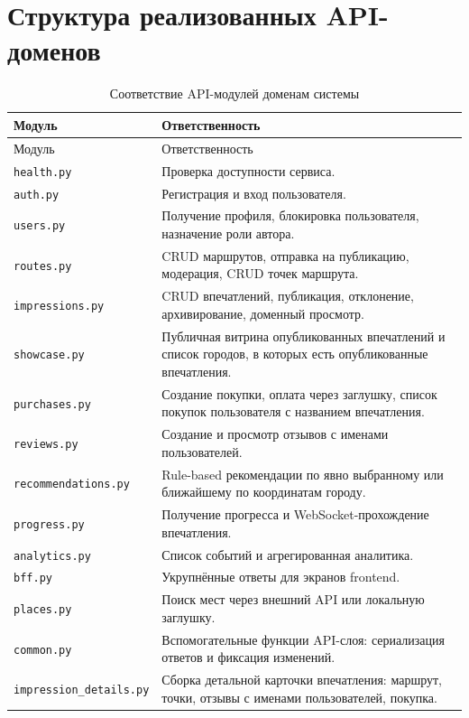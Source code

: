 \documentclass[a4paper,12pt]{extarticle}
\begin{document}
\newpage
\appendix

\section{Структура реализованных API-доменов}

\begin{longtable}{L{0.24\textwidth}L{0.66\textwidth}}
	\caption{Соответствие API-модулей доменам системы}
	\label{table:api-modules}\\
	\toprule
	Модуль & Ответственность \\
	\midrule
	\endfirsthead
	\toprule
	Модуль & Ответственность \\
	\midrule
	\endhead
	\texttt{health.py} & Проверка доступности сервиса. \\
	\texttt{auth.py} & Регистрация и вход пользователя. \\
	\texttt{users.py} & Получение профиля, блокировка пользователя, назначение роли автора. \\
	\texttt{routes.py} & CRUD маршрутов, отправка на публикацию, модерация, CRUD точек маршрута. \\
	\texttt{impressions.py} & CRUD впечатлений, публикация, отклонение, архивирование, доменный просмотр. \\
	\texttt{showcase.py} & Публичная витрина опубликованных впечатлений и список городов, в которых есть опубликованные впечатления. \\
	\texttt{purchases.py} & Создание покупки, оплата через заглушку, список покупок пользователя с названием впечатления. \\
	\texttt{reviews.py} & Создание и просмотр отзывов с именами пользователей. \\
	\texttt{recommendations.py} & Rule-based рекомендации по явно выбранному или ближайшему по координатам городу. \\
	\texttt{progress.py} & Получение прогресса и WebSocket-прохождение впечатления. \\
	\texttt{analytics.py} & Список событий и агрегированная аналитика. \\
	\texttt{bff.py} & Укрупнённые ответы для экранов frontend. \\
	\texttt{places.py} & Поиск мест через внешний API или локальную заглушку. \\
	\texttt{common.py} & Вспомогательные функции API-слоя: сериализация ответов и фиксация изменений. \\
	\texttt{impression\_details.py} & Сборка детальной карточки впечатления: маршрут, точки, отзывы с именами пользователей, покупка. \\
	\bottomrule
\end{longtable}
\end{document}
